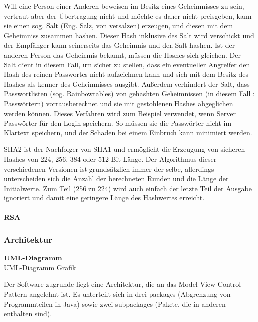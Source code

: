 \documentclass[12pt,a4paper,bibliography=totocnumbered,listof=totocnumbered]{scrartcl}
\begin{document}
Will eine Person einer Anderen beweisen im Besitz eines Geheimnisses zu sein, vertraut aber der Übertragung nicht und möchte es daher nicht preisgeben, kann sie einen sog. Salt (Eng. Salz, von versalzen) erzeugen, und diesen mit dem Geheimniss zusammen hashen. Dieser Hash inklusive des Salt wird verschickt und der Empfänger kann seinerseits das Geheimnis und den Salt hashen. Ist der anderen Person das Geheimnis bekannt, müssen die Hashes sich gleichen. Der Salt dient in diesem Fall, um sicher zu stellen, dass ein eventueller Angreifer den Hash des reinen Passwortes nicht aufzeichnen kann und sich mit dem Besitz des Hashes als kenner des Geheimnisses ausgibt. Außerdem verhindert der Salt, dass Passwortlisten (sog. Rainbowtables) von gehashten Geheimnissen (in diesem Fall : Passwörtern) vorrausberechnet und sie mit gestohlenen Hashes abgeglichen werden können. Dieses Verfahren wird zum Beispiel verwendet, wenn Server Passwörter für den Login speichern. So müssen sie die Passwörter nicht im Klartext speichern, und der Schaden bei einem Einbruch kann minimiert werden. 

SHA2 ist der Nachfolger von SHA1 und ermöglicht die Erzeugung von sicheren Hashes von 224, 256, 384 oder 512 Bit Länge. Der Algorithmus dieser verschiedenen Versionen ist grundsätzlich immer der selbe, allerdings unterscheiden sich die Anzahl der berechneten Runden und die Länge der Initialwerte. Zum Teil (256 zu 224) wird auch einfach der letzte Teil der Ausgabe ignoriert und damit eine geringere Länge des Hashwertes erreicht.
\\\cite{8}\cite{9}\cite{10}\\

\textbf{RSA}\\
\pagebreak

\subsubsection{Architektur}
\textbf{UML-Diagramm}\\
UML-Diagramm Grafik

Der Software zugrunde liegt eine Architektur, die an das Model-View-Control Pattern angelehnt ist. Es unterteilt sich in drei packages (Abgrenzung von Programmteilen in Java) sowie zwei subpackages (Pakete, die in anderen enthalten sind).
\end{document}
